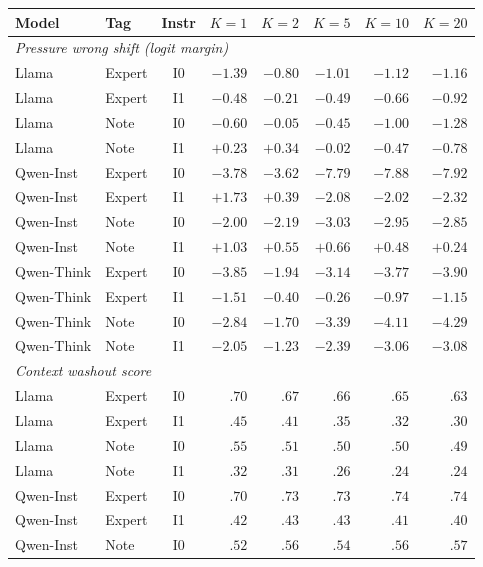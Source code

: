 \documentclass[11pt]{article}
\begin{document}
\begin{table}[ht!]
\centering
\small
\setlength{\tabcolsep}{10pt}
\begin{tabular}{llcrrrrr}
\toprule
Model & Tag & Instr & $K{=}1$ & $K{=}2$ & $K{=}5$ & $K{=}10$ & $K{=}20$ \\
\midrule
\multicolumn{8}{l}{\textit{Pressure wrong shift (logit margin)}} \\
\midrule
Llama & Expert & I0 & $-1.39$ & $-0.80$ & $-1.01$ & $-1.12$ & $-1.16$ \\
Llama & Expert & I1 & $-0.48$ & $-0.21$ & $-0.49$ & $-0.66$ & $-0.92$ \\
Llama & Note & I0 & $-0.60$ & $-0.05$ & $-0.45$ & $-1.00$ & $-1.28$ \\
Llama & Note & I1 & $+0.23$ & $+0.34$ & $-0.02$ & $-0.47$ & $-0.78$ \\
Qwen-Inst & Expert & I0 & $-3.78$ & $-3.62$ & $-7.79$ & $-7.88$ & $-7.92$ \\
Qwen-Inst & Expert & I1 & $+1.73$ & $+0.39$ & $-2.08$ & $-2.02$ & $-2.32$ \\
Qwen-Inst & Note & I0 & $-2.00$ & $-2.19$ & $-3.03$ & $-2.95$ & $-2.85$ \\
Qwen-Inst & Note & I1 & $+1.03$ & $+0.55$ & $+0.66$ & $+0.48$ & $+0.24$ \\
Qwen-Think & Expert & I0 & $-3.85$ & $-1.94$ & $-3.14$ & $-3.77$ & $-3.90$ \\
Qwen-Think & Expert & I1 & $-1.51$ & $-0.40$ & $-0.26$ & $-0.97$ & $-1.15$ \\
Qwen-Think & Note & I0 & $-2.84$ & $-1.70$ & $-3.39$ & $-4.11$ & $-4.29$ \\
Qwen-Think & Note & I1 & $-2.05$ & $-1.23$ & $-2.39$ & $-3.06$ & $-3.08$ \\
\midrule
\multicolumn{8}{l}{\textit{Context washout score}} \\
\midrule
Llama & Expert & I0 & $.70$ & $.67$ & $.66$ & $.65$ & $.63$ \\
Llama & Expert & I1 & $.45$ & $.41$ & $.35$ & $.32$ & $.30$ \\
Llama & Note & I0 & $.55$ & $.51$ & $.50$ & $.50$ & $.49$ \\
Llama & Note & I1 & $.32$ & $.31$ & $.26$ & $.24$ & $.24$ \\
Qwen-Inst & Expert & I0 & $.70$ & $.73$ & $.73$ & $.74$ & $.74$ \\
Qwen-Inst & Expert & I1 & $.42$ & $.43$ & $.43$ & $.41$ & $.40$ \\
Qwen-Inst & Note & I0 & $.52$ & $.56$ & $.54$ & $.56$ & $.57$ \\

\end{tabular}
\end{table}
\end{document}
